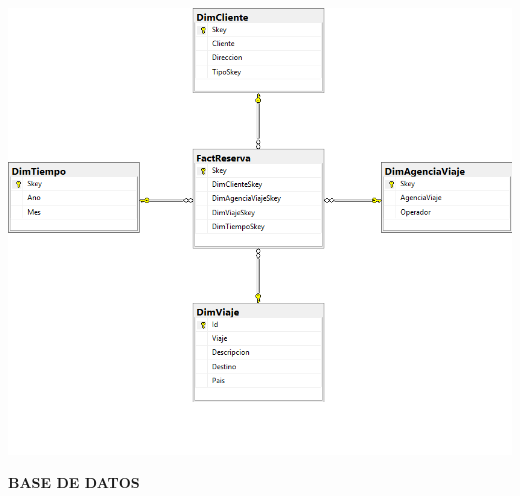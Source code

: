 \documentclass[12pt,letterpaper]{article}
\begin{document}
\begin{center} 
\includegraphics[width=14cm]{imagenes/d2.png}\\
\end{center} 
\newpage
\textbf{BASE DE DATOS}\\\\
\end{document}
